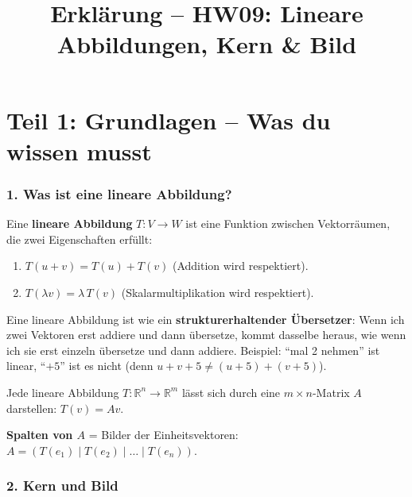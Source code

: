\documentclass[a4paper,12pt]{article}
\title{Erkl\"arung -- HW09: Lineare Abbildungen, Kern \& Bild}
\author{}
\date{}
\begin{document}
\maketitle

\part*{Teil 1: Grundlagen -- Was du wissen musst}

\section*{1. Was ist eine lineare Abbildung?}

Eine \textbf{lineare Abbildung} $T \colon V \to W$ ist eine Funktion zwischen Vektorr\"aumen, die zwei Eigenschaften erf\"ullt:
\begin{enumerate}[nosep]
    \item $T(u + v) = T(u) + T(v)$ (Addition wird respektiert).
    \item $T(\lambda v) = \lambda \, T(v)$ (Skalarmultiplikation wird respektiert).
\end{enumerate}

\begin{analogie}
Eine lineare Abbildung ist wie ein \textbf{strukturerhaltender \"Ubersetzer}: Wenn ich zwei Vektoren erst addiere und dann \"ubersetze, kommt dasselbe heraus, wie wenn ich sie erst einzeln \"ubersetze und dann addiere. Beispiel: ``mal 2 nehmen'' ist linear, ``$+5$'' ist es nicht (denn $u + v + 5 \neq (u+5) + (v+5)$).
\end{analogie}

\begin{merkbox}[title={Darstellungsmatrix}]
Jede lineare Abbildung $T \colon \mathbb{R}^n \to \mathbb{R}^m$ l\"asst sich durch eine $m \times n$-Matrix $A$ darstellen: $T(v) = A v$.

\medskip
\textbf{Spalten von $A$} = Bilder der Einheitsvektoren: $A = (T(e_1) \mid T(e_2) \mid \dots \mid T(e_n))$.
\end{merkbox}

\section*{2. Kern und Bild}
\end{document}

